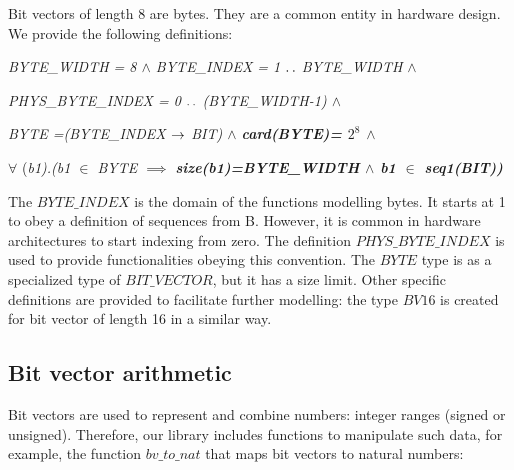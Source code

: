 \documentclass[a4paper]{llncs}
\begin{document}
Bit vectors of length 8 are bytes. They are a common entity in
hardware design. We provide the following definitions:


\hspace*{0.0in}\it BYTE\_WIDTH \rm = 8 $\land$ \it BYTE\_INDEX \rm = 1 $\mathbin{\ldotp\ldotp}$ \rm  BYTE\_WIDTH\rm  \hspace*{0.05in} $\land$

\hspace*{0.0in}\it PHYS\_BYTE\_INDEX \rm = \rm 0 $\mathbin{\ldotp\ldotp}$ \rm (\it BYTE\_WIDTH\rm -\rm 1\rm )\hspace*{0.10in} $\land$

\hspace*{0.0in}\it BYTE \rm =\rm (\it BYTE\_INDEX  $\rightarrow$  \it BIT\rm )\hspace*{0.10in} $\land$  \bf card\rm (\it BYTE\rm )\rm = $2^{8}$  $\land$

\hspace*{0.0in}$\forall$ \rm (\it b1\rm )\rm .\rm (\it b1  $\in$  \it BYTE  $\implies$  \bf size\rm (\it b1\rm )\rm =\it BYTE\_WIDTH  $\land$  \it b1  $\in$  \bf seq1\rm (\it BIT\rm )\rm ) 



The $\textit{BYTE\_INDEX}$ is the domain of the functions modelling bytes. It starts at 1 to obey a
definition of sequences from B. However, it is common in hardware architectures to start indexing from
zero. The definition $\textit{PHYS\_BYTE\_INDEX}$ is used to provide functionalities obeying this
convention. The $\textit{BYTE}$ type is as a specialized type of $\textit{BIT\_VECTOR}$, but it has a size
limit. Other specific definitions are provided to facilitate further modelling: the type $\textit{BV16}$
is created for bit vector of length 16 in a similar way.



\subsection{Bit vector arithmetic}
\label{subsec:Types}
 

Bit vectors are used to represent and combine numbers: integer ranges (signed or unsigned). Therefore, our
library includes functions to manipulate such data, for example, the function $\textit{bv\_to\_nat}$ that
maps bit vectors to natural numbers:
\end{document}
